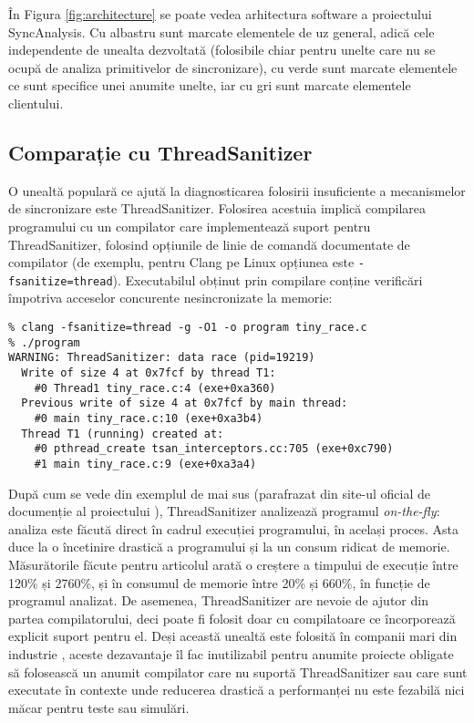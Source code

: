 În Figura \ref{fig:architecture} se poate vedea arhitectura software a
proiectului SyncAnalysis. Cu albastru sunt marcate elementele de uz
general, adică cele independente de unealta dezvoltată (folosibile chiar
pentru unelte care nu se ocupă de analiza primitivelor de sincronizare),
cu verde sunt marcate elementele ce sunt specifice unei anumite unelte,
iar cu gri sunt marcate elementele clientului.

\subsection{Comparație cu ThreadSanitizer}
O unealtă populară ce ajută la diagnosticarea folosirii insuficiente a
mecanismelor de sincronizare este ThreadSanitizer\cite{ThreadSanitizer}.
Folosirea acestuia implică compilarea programului cu un compilator care
implementează suport pentru ThreadSanitizer, folosind opțiunile de linie
de comandă documentate de compilator (de exemplu, pentru Clang pe Linux
opțiunea este \lstinline{-fsanitize=thread}). Executabilul obținut prin
compilare conține verificări împotriva acceselor concurente
nesincronizate la memorie:

\begin{minipage}{\linewidth}
\begin{lstlisting}
% clang -fsanitize=thread -g -O1 -o program tiny_race.c
% ./program
WARNING: ThreadSanitizer: data race (pid=19219)
  Write of size 4 at 0x7fcf by thread T1:
    #0 Thread1 tiny_race.c:4 (exe+0xa360)
  Previous write of size 4 at 0x7fcf by main thread:
    #0 main tiny_race.c:10 (exe+0xa3b4)
  Thread T1 (running) created at:
    #0 pthread_create tsan_interceptors.cc:705 (exe+0xc790)
    #1 main tiny_race.c:9 (exe+0xa3a4)
\end{lstlisting}
\end{minipage}

După cum se vede din exemplul de mai sus (parafrazat din site-ul oficial
de documenție al proiectului \cite{ThreadSanitizerDoc}), ThreadSanitizer
analizează programul \textit{on-the-fly}: analiza este făcută direct în
cadrul execuției programului, în același proces. Asta duce la o
încetinire drastică a programului și la un consum ridicat de memorie.
Măsurătorile făcute pentru articolul \cite{ThreadSanitizer} arată o
creștere a timpului de execuție între 120\% și 2760\%, și în consumul de
memorie între 20\% și 660\%, în funcție de programul analizat. De
asemenea, ThreadSanitizer are nevoie de ajutor din partea
compilatorului, deci poate fi folosit doar cu compilatoare ce
încorporează explicit suport pentru el. Deși această unealtă este
folosită în companii mari din industrie \cite{ThreadSanitizer}, aceste
dezavantaje îl fac inutilizabil pentru anumite proiecte obligate să
folosească un anumit compilator care nu suportă ThreadSanitizer sau
care sunt executate în contexte unde reducerea drastică a performanței
nu este fezabilă nici măcar pentru teste sau simulări.

